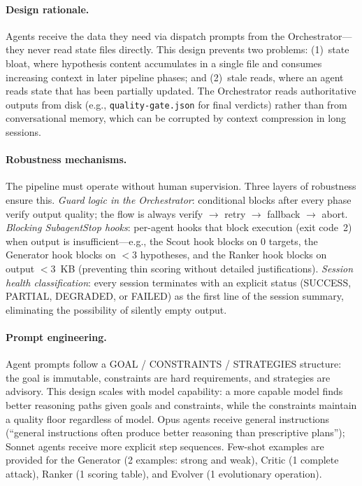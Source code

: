 \paragraph{Design rationale.} Agents receive the data they need via dispatch prompts from the Orches\-trator---they never read state files directly. This design prevents two problems: (1)~state bloat, where hypothesis content accumulates in a single file and consumes increasing context in later pipeline phases; and (2)~stale reads, where an agent reads state that has been partially updated. The Orchestrator reads authoritative outputs from disk (e.g., \texttt{quality-gate.json} for final verdicts) rather than from conversational memory, which can be corrupted by context compression in long sessions.

\paragraph{Robustness mechanisms.} The pipeline must operate without human supervision. Three layers of robustness ensure this. \emph{Guard logic in the Orchestrator}: conditional blocks after every phase verify output quality; the flow is always verify $\to$ retry $\to$ fallback $\to$ abort. \emph{Blocking SubagentStop hooks}: per-agent hooks that block execution (exit code~2) when output is insufficient---e.g., the Scout hook blocks on 0 targets, the Generator hook blocks on $<3$ hypotheses, and the Ranker hook blocks on output $<3$~KB (preventing thin scoring without detailed justifications). \emph{Session health classification}: every session terminates with an explicit status (SUCCESS, PARTIAL, DEGRADED, or FAILED) as the first line of the session summary, eliminating the possibility of silently empty output.

\paragraph{Prompt engineering.} Agent prompts follow a GOAL / CONSTRAINTS / STRATEGIES structure: the goal is immutable, constraints are hard requirements, and strategies are advisory. This design scales with model capability: a more capable model finds better reasoning paths given goals and constraints, while the constraints maintain a quality floor regardless of model. Opus agents receive general instructions (``general instructions often produce better reasoning than prescriptive plans''); Sonnet agents receive more explicit step sequences. Few-shot examples are provided for the Generator (2 examples: strong and weak), Critic (1 complete attack), Ranker (1 scoring table), and Evolver (1 evolutionary operation).
